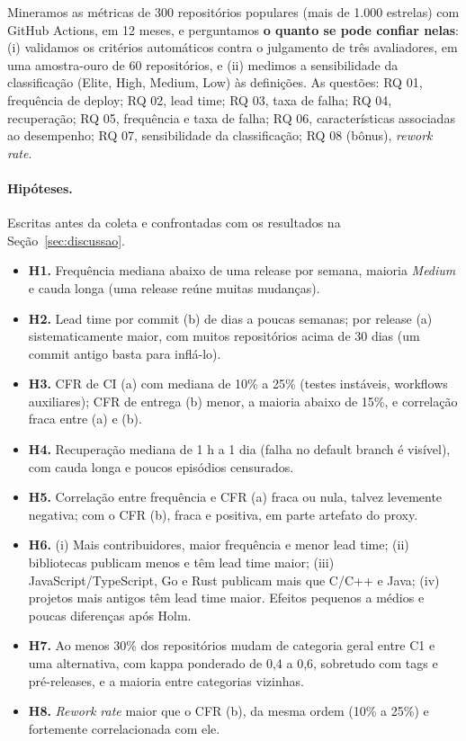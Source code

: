 \documentclass[12pt]{article}
\begin{document}
Mineramos as métricas de 300 repositórios populares (mais de 1.000 estrelas) com GitHub Actions, em 12 meses, e perguntamos \textbf{o quanto se pode confiar nelas}: (i) validamos os critérios automáticos contra o julgamento de três avaliadores, em uma amostra-ouro de 60 repositórios, e (ii) medimos a sensibilidade da classificação (Elite, High, Medium, Low) às definições. As questões: RQ 01, frequência de deploy; RQ 02, lead time; RQ 03, taxa de falha; RQ 04, recuperação; RQ 05, frequência e taxa de falha; RQ 06, características associadas ao desempenho; RQ 07, sensibilidade da classificação; RQ 08 (bônus), \emph{rework rate}.

\paragraph{Hipóteses.} Escritas antes da coleta e confrontadas com os resultados na Seção~\ref{sec:discussao}.
\begin{itemize}\setlength{\itemsep}{0pt}\setlength{\parskip}{0pt}
\item \textbf{H1.} Frequência mediana abaixo de uma release por semana, maioria \emph{Medium} e cauda longa (uma release reúne muitas mudanças).
\item \textbf{H2.} Lead time por commit (b) de dias a poucas semanas; por release (a) sistematicamente maior, com muitos repositórios acima de 30 dias (um commit antigo basta para inflá-lo).
\item \textbf{H3.} CFR de CI (a) com mediana de 10\% a 25\% (testes instáveis, workflows auxiliares); CFR de entrega (b) menor, a maioria abaixo de 15\%, e correlação fraca entre (a) e (b).
\item \textbf{H4.} Recuperação mediana de 1 h a 1 dia (falha no default branch é visível), com cauda longa e poucos episódios censurados.
\item \textbf{H5.} Correlação entre frequência e CFR (a) fraca ou nula, talvez levemente negativa; com o CFR (b), fraca e positiva, em parte artefato do proxy.
\item \textbf{H6.} (i) Mais contribuidores, maior frequência e menor lead time; (ii) bibliotecas publicam menos e têm lead time maior; (iii) JavaScript/TypeScript, Go e Rust publicam mais que C/C++ e Java; (iv) projetos mais antigos têm lead time maior. Efeitos pequenos a médios e poucas diferenças após Holm.
\item \textbf{H7.} Ao menos 30\% dos repositórios mudam de categoria geral entre C1 e uma alternativa, com kappa ponderado de 0,4 a 0,6, sobretudo com tags e pré-releases, e a maioria entre categorias vizinhas.
\item \textbf{H8.} \emph{Rework rate} maior que o CFR (b), da mesma ordem (10\% a 25\%) e fortemente correlacionada com ele.
\end{itemize}
\end{document}
